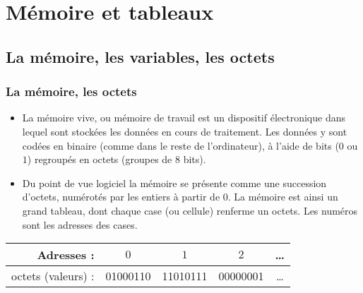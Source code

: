 \documentclass[xcolor=pdftex,svgnames,table]{beamer}
\begin{document}
\section{Mémoire et tableaux}
\subsection{La mémoire, les variables, les octets}
\begin{frame}
  \frametitle{La mémoire, les octets}

  \begin{itemize}\item 
    La mémoire vive, ou mémoire de travail est un dispositif
    électronique dans lequel sont stockées les données en cours de
    traitement. Les données y sont codées en binaire (comme dans le
    reste de l'ordinateur), à l'aide de bits ($0$ ou $1$) regroupés en
    \alert{octets} (groupes de 8 bits).
\pause
\item    Du point de vue logiciel la mémoire se présente comme une
    succession d'octets, numérotés par les entiers à partir de
    $0$. La mémoire est ainsi un grand tableau, dont chaque case (ou
    cellule) renferme un octets. Les numéros sont les adresses
    des cases.
\pause
\end{itemize}
\begin{tabular}{r|c|c|c| c }
  \hline
  Adresses : & $0$ & $1$ & $2$ & \ldots \\ \hline
  octets (valeurs) :  & {\small 01000110} & {\small 11010111} & {\small 00000001} & \ldots \\
  \hline
\end{tabular}
\end{frame}
\end{document}
